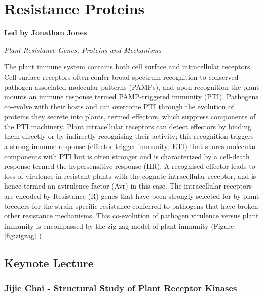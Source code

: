 \documentclass[12pt,]{book}
\begin{document}
\chapter*{Resistance Proteins}\label{resistance-proteins}

\textbf{Led by Jonathan Jones}

\emph{Plant Resistance Genes, Proteins and Mechanisms}

The plant immune system contains both cell surface and intracellular
receptors. Cell surface receptors often confer broad spectrum
recognition to conserved pathogen-associated molecular patterns (PAMPs),
and upon recognition the plant mounts an immune response termed
PAMP-triggered immunity (PTI). Pathogens co-evolve with their hosts and
can overcome PTI through the evolution of proteins they secrete into
plants, termed effectors, which suppress components of the PTI
machinery. Plant intracellular receptors can detect effectors by binding
them directly or by indirectly recognising their activity; this
recognition triggers a strong immune response (effector-trigger
immunity; ETI) that shares molecular components with PTI but is often
stronger and is characterized by a cell-death response termed the
hypersensitive response (HR). A recognised effector leads to loss of
virulence in resistant plants with the cognate intracellular receptor,
and is hence termed an avirulence factor (Avr) in this case. The
intracellular receptors are encoded by Resistance (R) genes that have
been strongly selected for by plant breeders for the strain-specific
resistance conferred to pathogens that have broken other resistance
mechanisms. This co-evolution of pathogen virulence versus plant
immunity is encompassed by the zig-zag model of plant immunity (Figure
\ref{fig:zigzag} )

\section*{Keynote Lecture}\label{keynote-lecture}

\subsection*{Jijie Chai - Structural Study of Plant Receptor
Kinases}\label{jijie-chai---structural-study-of-plant-receptor-kinases}
\end{document}
